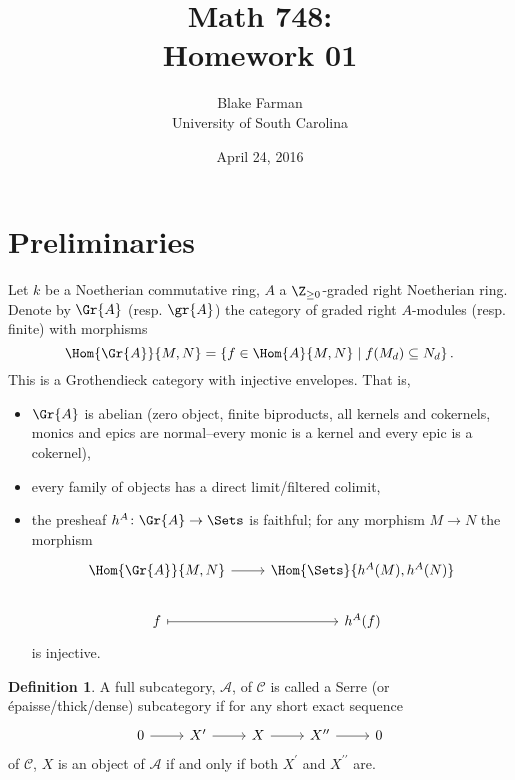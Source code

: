 \documentclass[10pt]{amsart}
\author{Blake Farman\\University of South Carolina}
\title{Math 748:\\Homework 01}
\date{April 24, 2016}
\begin{document}

\providecommand{\p}{\mathfrak{p}}
\providecommand{\m}{\mathfrak{m}}
\providecommand{\Deck}[1]{\operatorname{Deck}\left(#1\right)}
\newtheorem{thm}{Theorem}
\newtheorem{ex}{}
\newtheorem{lem}{Lemma}
\newtheorem{cor}{Corollary}
\newtheorem{prop}{Proposition}
\theoremstyle{definition}
\newtheorem{defn}{Definition}
\newtheorem{rmk}{Remark}

\newcommand{\A}{\mathscr{A}}
\renewcommand{\C}{\mathscr{C}}

\section{Preliminaries}
Let $k$ be a Noetherian commutative ring, $A$ a $\Z_{\geq 0}$-graded right Noetherian ring.
Denote by $\Gr{A}$ (resp. $\gr{A}$) the category of graded right $A$-modules (resp. finite) with morphisms
$$\Hom{\Gr{A}}{M,N} = \left\{f \in \Hom{A}{M,N} \;\middle\vert\; f(M_d) \subseteq N_d\right\}.$$
This is a Grothendieck category with injective envelopes.
That is,
\begin{itemize}
\item
  $\Gr{A}$ is abelian (zero object, finite biproducts, all kernels and cokernels, monics and epics are normal--every monic is a kernel and every epic is a cokernel),
\item
  every family of objects has a direct limit/filtered colimit,
\item
  the presheaf $h^A \colon \Gr{A} \rightarrow \Sets$ is faithful; for any morphism $M \rightarrow N$ the morphism
  $$\begin{tikzcd}
    \Hom{\Gr{A}}{M, N} \arrow{r}& \Hom{\Sets}{h^A(M), h^A(N)}\\
    f \arrow[mapsto]{r} & h^A(f)
  \end{tikzcd}$$
  is injective.
\end{itemize}

\begin{defn}
  A full subcategory, $\A$, of $\C$ is called a Serre (or \'{e}paisse/thick/dense) subcategory if for any short exact sequence
  $$\begin{tikzcd}
    0 \arrow{r} & X^\prime \arrow{r} & X \arrow{r} & X^{\prime\prime} \arrow{r} & 0
  \end{tikzcd}$$
  of $\C$, $X$ is an object of $\A$ if and only if both $X^\prime$ and $X^{\prime\prime}$ are.
\end{defn}
\end{document}
